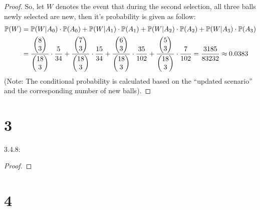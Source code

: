 \documentclass{article}
\begin{document}
\begin{proof}
    So, let $W$ denotes the event that during the second selection, all three balls newly selected are new, then it's probability is given as follow:
    \begin{align}
        \mathbb{P}(W)&=\mathbb{P}(W|A_0)\cdot \mathbb{P}(A_0)+\mathbb{P}(W|A_1)\cdot \mathbb{P}(A_1)+\mathbb{P}(W|A_2)\cdot \mathbb{P}(A_2)+\mathbb{P}(W|A_3)\cdot \mathbb{P}(A_3)\\
        &= \frac{\begin{pmatrix}8\\3\end{pmatrix}}{\begin{pmatrix}18\\3\end{pmatrix}}\cdot \frac{5}{34}+\frac{\begin{pmatrix}7\\3\end{pmatrix}}{\begin{pmatrix}18\\3\end{pmatrix}}\cdot \frac{15}{34}+\frac{\begin{pmatrix}6\\3\end{pmatrix}}{\begin{pmatrix}18\\3\end{pmatrix}}\cdot\frac{35}{102}+\frac{\begin{pmatrix}5\\3\end{pmatrix}}{\begin{pmatrix}18\\3\end{pmatrix}}\cdot\frac{7}{102} = \frac{3185}{83232}\approx 0.0383
    \end{align}
    (Note: The conditional probability is calculated based on the ``updated scenario'' and the corresponding number of new balls).
\end{proof}

\newpage
\section*{3}
\begin{ques}\label{q3}
    3.4.8:

    
\end{ques}

\begin{proof}
\end{proof}

\newpage
\section*{4}
\begin{ques}\label{q4}
\end{ques}
\end{document}
